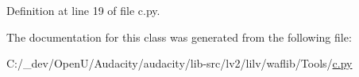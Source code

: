 Definition at line 19 of file c.\+py.



The documentation for this class was generated from the following file\+:\begin{DoxyCompactItemize}
\item 
C\+:/\+\_\+dev/\+Open\+U/\+Audacity/audacity/lib-\/src/lv2/lilv/waflib/\+Tools/\hyperlink{lilv_2waflib_2_tools_2c_8py}{c.\+py}\end{DoxyCompactItemize}
